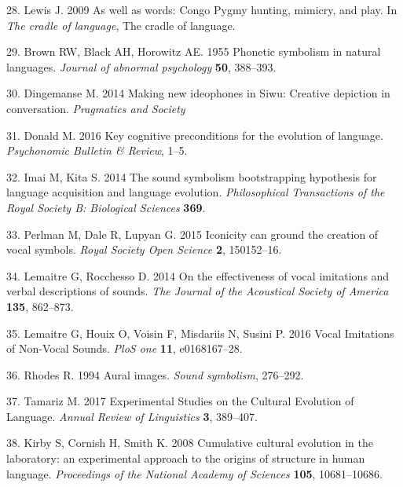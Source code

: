 \documentclass[english,floatsintext,man]{apa6}
\theoremstyle{definition}
\theoremstyle{definition}
\theoremstyle{definition}
\theoremstyle{remark}
\begin{document}
\leavevmode\hypertarget{ref-Lewis:2009wz}{}%
28. Lewis J. 2009 As well as words: Congo Pygmy hunting, mimicry, and
play. In \emph{The cradle of language}, The cradle of language.

\leavevmode\hypertarget{ref-Brown:1955wy}{}%
29. Brown RW, Black AH, Horowitz AE. 1955 Phonetic symbolism in natural
languages. \emph{Journal of abnormal psychology} \textbf{50}, 388--393.

\leavevmode\hypertarget{ref-Dingemanse:2014gj}{}%
30. Dingemanse M. 2014 Making new ideophones in Siwu: Creative depiction
in conversation. \emph{Pragmatics and Society}

\leavevmode\hypertarget{ref-Donald:2016kd}{}%
31. Donald M. 2016 Key cognitive preconditions for the evolution of
language. \emph{Psychonomic Bulletin \& Review}, 1--5.

\leavevmode\hypertarget{ref-Imai:2014dea}{}%
32. Imai M, Kita S. 2014 The sound symbolism bootstrapping hypothesis
for language acquisition and language evolution. \emph{Philosophical
Transactions of the Royal Society B: Biological Sciences} \textbf{369}.

\leavevmode\hypertarget{ref-Perlman:2015ip}{}%
33. Perlman M, Dale R, Lupyan G. 2015 Iconicity can ground the creation
of vocal symbols. \emph{Royal Society Open Science} \textbf{2},
150152--16.

\leavevmode\hypertarget{ref-Lemaitre:2014kr}{}%
34. Lemaitre G, Rocchesso D. 2014 On the effectiveness of vocal
imitations and verbal descriptions of sounds. \emph{The Journal of the
Acoustical Society of America} \textbf{135}, 862--873.

\leavevmode\hypertarget{ref-Lemaitre:2016kz}{}%
35. Lemaitre G, Houix O, Voisin F, Misdariis N, Susini P. 2016 Vocal
Imitations of Non-Vocal Sounds. \emph{PloS one} \textbf{11},
e0168167--28.

\leavevmode\hypertarget{ref-Rhodes:1994au}{}%
36. Rhodes R. 1994 Aural images. \emph{Sound symbolism}, 276--292.

\leavevmode\hypertarget{ref-Tamariz:2017bd}{}%
37. Tamariz M. 2017 Experimental Studies on the Cultural Evolution of
Language. \emph{Annual Review of Linguistics} \textbf{3}, 389--407.

\leavevmode\hypertarget{ref-Kirby:2008kja}{}%
38. Kirby S, Cornish H, Smith K. 2008 Cumulative cultural evolution in
the laboratory: an experimental approach to the origins of structure in
human language. \emph{Proceedings of the National Academy of Sciences}
\textbf{105}, 10681--10686.
\end{document}
